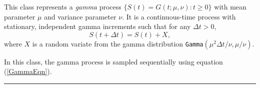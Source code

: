 
This class represents a \emph{gamma} process \cite[page 82]{fMAD98a}
$\{ S(t) = G(t; \mu, \nu) : t \geq 0 \}$ with mean parameter $\mu$ and
variance parameter $\nu$.
It is a continuous-time process with stationary,
independent gamma increments such that for any $\Delta t > 0$,
\begin{equation}
 S(t + \Delta t) = S(t) + X,\label{GammaEqn}
\end{equation}
where $X$ is a random variate from the gamma distribution
\texttt{Gamma}$(\mu^{2}\Delta t / \nu , \mu / \nu)$.

In this class, the gamma process is sampled sequentially using
equation (\ref{GammaEqn}).

\bigskip\hrule\bigskip

